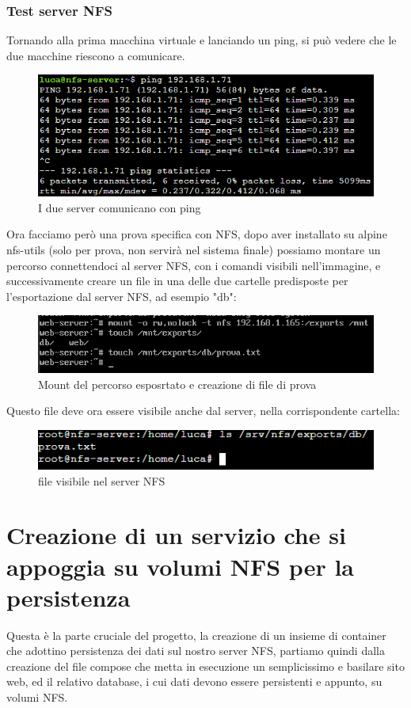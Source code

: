 \documentclass[a4paper]{article}
\begin{document}
\subsubsection{Test server NFS}
Tornando alla prima macchina virtuale e lanciando un ping, si può vedere che le due macchine riescono a 
comunicare.
\begin{figure}[H]
    \centering
    \includegraphics[scale=0.8]{images/MacchineComunicano.png}
    \caption{I due server comunicano con ping}
\end{figure}
Ora facciamo però una prova specifica con NFS, dopo aver installato su alpine nfs-utils (solo per prova, non servirà nel sistema finale)
possiamo montare un percorso connettendoci al server NFS, con i comandi visibili nell'immagine, e successivamente creare un file in una delle
due cartelle predisposte per l'esportazione dal server NFS, ad esempio "db":
\begin{figure}[H]
    \centering
    \includegraphics[scale=0.8]{images/ProvaNFS.png}
    \caption{Mount del percorso esposrtato e creazione di file di prova}
\end{figure}
Questo file deve ora essere visibile anche dal server, nella corrispondente cartella:
\begin{figure}[H]
    \centering
    \includegraphics[scale=0.9]{images/NFSFunziona.png}
    \caption{file visibile nel server NFS}
\end{figure}
\section{Creazione di un servizio che si appoggia su volumi NFS per la persistenza}
Questa è la parte cruciale del progetto, la creazione di un insieme di container che adottino
persistenza dei dati sul nostro server NFS, partiamo quindi dalla creazione del file compose
che metta in esecuzione un semplicissimo e basilare sito web, ed il relativo database, i cui dati
devono essere persistenti e appunto, su volumi NFS.
\end{document}
